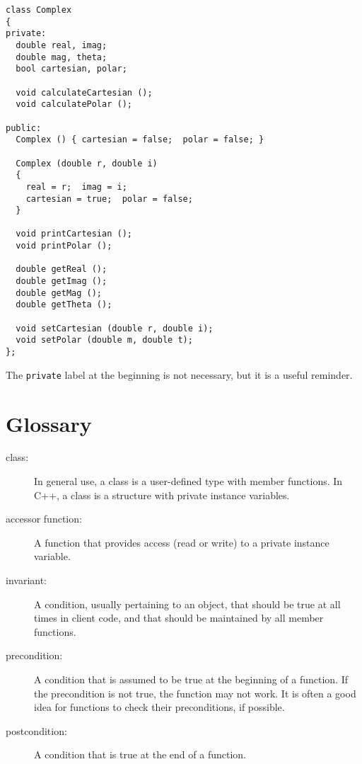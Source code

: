 \begin{verbatim}
class Complex
{
private:
  double real, imag;
  double mag, theta;
  bool cartesian, polar;

  void calculateCartesian ();
  void calculatePolar ();

public:
  Complex () { cartesian = false;  polar = false; }

  Complex (double r, double i)
  {
    real = r;  imag = i;
    cartesian = true;  polar = false;
  }

  void printCartesian ();
  void printPolar ();

  double getReal ();
  double getImag ();
  double getMag ();
  double getTheta ();

  void setCartesian (double r, double i);
  void setPolar (double m, double t);
};
\end{verbatim}
%
The {\tt private} label at the beginning is not necessary,
but it is a useful reminder.

\section{Glossary}

\begin{description}

\item[class:]  In general use, a class is a user-defined type
with member functions.  In C++, a class is a structure with
private instance variables.

\item[accessor function:]  A function that provides access
(read or write) to a private instance variable.

\item[invariant:]  A condition, usually pertaining to an object, that
should be true at all times in client code, and that should be
maintained by all member functions.

\item[precondition:]  A condition that is assumed to be true at
the beginning of a function.  If the precondition is not true, the
function may not work.  It is often a good idea for functions to
check their preconditions, if possible.

\item[postcondition:]  A condition that is true at the end of a
function. 


\end{description}

